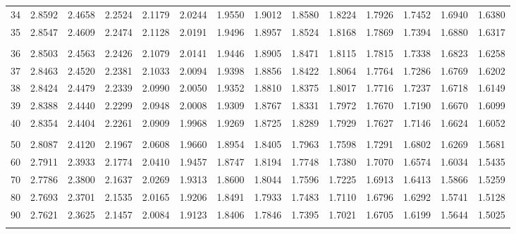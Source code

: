 {\begin{tabular}{l|lllllllllllll}
 34 & 2.8592 & 2.4658 & 2.2524 & 2.1179 & 2.0244 & 1.9550 & 1.9012 & 1.8580 & 1.8224 & 1.7926 & 1.7452 & 1.6940 & 1.6380 \\[5pt] \arrayrulecolor{light-gray}\hline\arrayrulecolor{black}  
 35 & 2.8547 & 2.4609 & 2.2474 & 2.1128 & 2.0191 & 1.9496 & 1.8957 & 1.8524 & 1.8168 & 1.7869 & 1.7394 & 1.6880 & 1.6317 \\[5pt] \arrayrulecolor{light-gray}\hline\arrayrulecolor{black}  
\\ 
 36 & 2.8503 & 2.4563 & 2.2426 & 2.1079 & 2.0141 & 1.9446 & 1.8905 & 1.8471 & 1.8115 & 1.7815 & 1.7338 & 1.6823 & 1.6258 \\[5pt] \arrayrulecolor{light-gray}\hline\arrayrulecolor{black}  
 37 & 2.8463 & 2.4520 & 2.2381 & 2.1033 & 2.0094 & 1.9398 & 1.8856 & 1.8422 & 1.8064 & 1.7764 & 1.7286 & 1.6769 & 1.6202 \\[5pt] \arrayrulecolor{light-gray}\hline\arrayrulecolor{black}  
 38 & 2.8424 & 2.4479 & 2.2339 & 2.0990 & 2.0050 & 1.9352 & 1.8810 & 1.8375 & 1.8017 & 1.7716 & 1.7237 & 1.6718 & 1.6149 \\[5pt] \arrayrulecolor{light-gray}\hline\arrayrulecolor{black}  
 39 & 2.8388 & 2.4440 & 2.2299 & 2.0948 & 2.0008 & 1.9309 & 1.8767 & 1.8331 & 1.7972 & 1.7670 & 1.7190 & 1.6670 & 1.6099 \\[5pt] \arrayrulecolor{light-gray}\hline\arrayrulecolor{black}  
 40 & 2.8354 & 2.4404 & 2.2261 & 2.0909 & 1.9968 & 1.9269 & 1.8725 & 1.8289 & 1.7929 & 1.7627 & 1.7146 & 1.6624 & 1.6052 \\[5pt] \arrayrulecolor{light-gray}\hline\arrayrulecolor{black}  
\\ 
 50 & 2.8087 & 2.4120 & 2.1967 & 2.0608 & 1.9660 & 1.8954 & 1.8405 & 1.7963 & 1.7598 & 1.7291 & 1.6802 & 1.6269 & 1.5681 \\[5pt] \arrayrulecolor{light-gray}\hline\arrayrulecolor{black}  
 60 & 2.7911 & 2.3933 & 2.1774 & 2.0410 & 1.9457 & 1.8747 & 1.8194 & 1.7748 & 1.7380 & 1.7070 & 1.6574 & 1.6034 & 1.5435 \\[5pt] \arrayrulecolor{light-gray}\hline\arrayrulecolor{black}  
 70 & 2.7786 & 2.3800 & 2.1637 & 2.0269 & 1.9313 & 1.8600 & 1.8044 & 1.7596 & 1.7225 & 1.6913 & 1.6413 & 1.5866 & 1.5259 \\[5pt] \arrayrulecolor{light-gray}\hline\arrayrulecolor{black}  
 80 & 2.7693 & 2.3701 & 2.1535 & 2.0165 & 1.9206 & 1.8491 & 1.7933 & 1.7483 & 1.7110 & 1.6796 & 1.6292 & 1.5741 & 1.5128 \\[5pt] \arrayrulecolor{light-gray}\hline\arrayrulecolor{black}  
 90 & 2.7621 & 2.3625 & 2.1457 & 2.0084 & 1.9123 & 1.8406 & 1.7846 & 1.7395 & 1.7021 & 1.6705 & 1.6199 & 1.5644 & 1.5025 \\[5pt] \arrayrulecolor{light-gray}\hline\arrayrulecolor{black}  

\end{tabular}}
